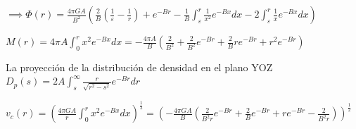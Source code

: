 \documentclass[12pt]{book}
\begin{document}
\begin{description}
\item $\implies \Phi(r) = \frac{4 \pi G A}{B^2}(\frac{2}{B}(\frac{1}{\varepsilon} - \frac{1}{r}) + e^{-Br} - \frac{1}{B}\int_\varepsilon^r{\frac{1}{x^2}e^{-Bx}dx} - 2\int_\varepsilon^r{\frac{1}{x} e^{-Bx}dx} ) $


\item $M(r) = 4 \pi A \int_0^r{x^2 e^{-Bx}dx} = -\frac{4 \pi A}{B}(\frac{2}{B^2} + \frac{2}{B^2}e^{-Br} +\frac{2}{B}r e^{-Br} + r^2 e^{-Br}) $
\item La proyección de la distribución de densidad en el plano YOZ
$D_p(s) = 2 A \int_s^\infty{\frac{r}{\sqrt{r^2-s^2}} e^{-Br} dr}$

\item $v_c(r) = (\frac{4 \pi G A}{r}\int_0^r{x^2 e^{-Bx}dx} )^{\frac{1}{2}}   
= (-\frac{4 \pi G A}{B}(\frac{2}{B^2r}e^{-Br} +\frac{2}{B} e^{-Br} + r e^{-Br} -  \frac{2}{B^2r} ))^{\frac{1}{2}} $

\end{description}
\end{document}
